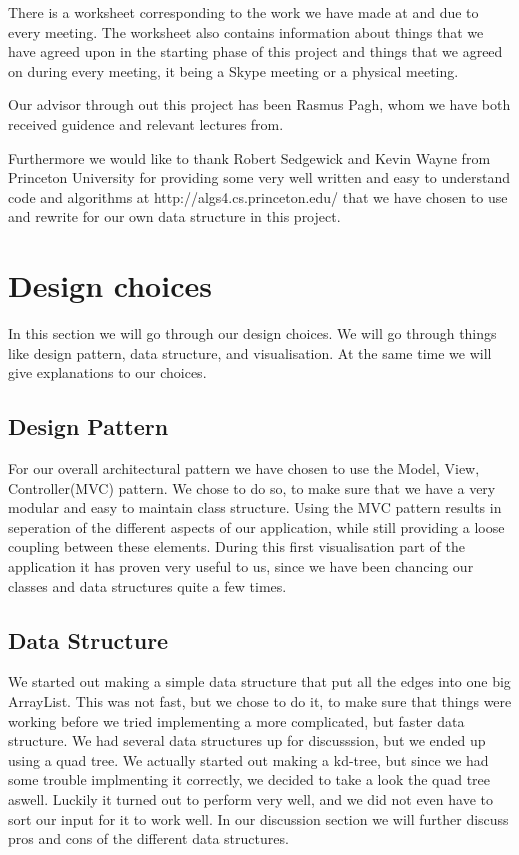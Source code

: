 \documentclass[a4paper,11pt]{article}
\begin{document}
There is a worksheet corresponding to the work we have made at and due to every meeting. The worksheet also contains information about things that we have agreed upon in the starting phase of this project and things that we agreed on during every meeting, it being a Skype meeting or a physical meeting. %

Our advisor through out this project has been Rasmus Pagh, whom we have both received guidence and relevant lectures from. 

Furthermore we would like to thank Robert Sedgewick and Kevin Wayne from Princeton University for providing some very well written and easy to understand code and algorithms at http://algs4.cs.princeton.edu/ that we have chosen to use and rewrite for our own data structure in this project.

\pagebreak
\section{Design choices} %
\label{sec:Design choices}
In this section we will go through our design choices. We will go through things like design pattern, data structure, and visualisation.
At the same time we will give explanations to our choices.

\subsection{Design Pattern} %
\label{sub:Design Pattern}
For our overall architectural pattern we have chosen to use the Model, View, Controller(MVC) pattern. We chose to do so, to make sure that we have
a very modular and easy to maintain class structure. Using the MVC pattern results in seperation of the different aspects of our application, while still providing a loose coupling between these elements. During this first visualisation part of the application it has proven very useful to us, since we
have been chancing our classes and data structures quite a few times.


\subsection{Data Structure} %
\label{sub:Data Structure}
We started out making a simple data structure that put all the edges into one big ArrayList. This was not fast, but we chose to do it, to make sure that
things were working before we tried implementing a more complicated, but faster data structure. We had several data structures up for discusssion, but we ended up using a quad tree. We actually started out making a kd-tree, but since we had some trouble implmenting it correctly, we decided to take a look
the quad tree aswell. Luckily it turned out to perform very well, and we did not even have to sort our input for it to work well. In our discussion 
section we will further discuss pros and cons of the different data structures.
\end{document}

